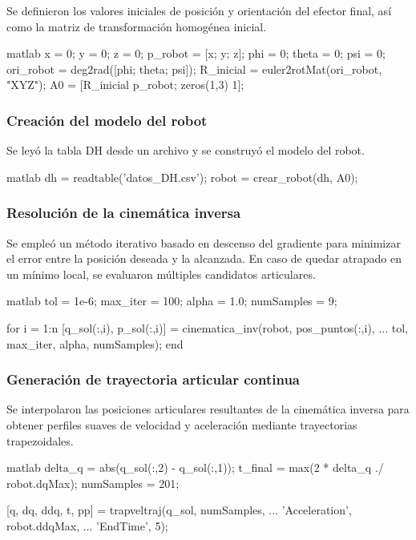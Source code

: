 Se definieron los valores iniciales de posición y orientación del efector final, así como la matriz de transformación homogénea inicial.

\begin{matlabcode}{matlab}
	x = 0; y = 0; z = 0;
	p_robot = [x; y; z];
	phi = 0; theta = 0; psi = 0;
	ori_robot = deg2rad([phi; theta; psi]);
	R_inicial = euler2rotMat(ori_robot, "XYZ");
	A0 = [R_inicial p_robot; zeros(1,3) 1];
\end{matlabcode}

\subsubsection*{Creación del modelo del robot}

Se leyó la tabla DH desde un archivo y se construyó el modelo del robot.

\begin{matlabcode}{matlab}
	dh = readtable('datos\tabla_DH\robotnuestro.csv');
	robot = crear_robot(dh, A0);
\end{matlabcode}


\subsubsection*{Resolución de la cinemática inversa}

Se empleó un método iterativo basado en descenso del gradiente para minimizar el error entre la posición deseada y la alcanzada. En caso de quedar atrapado en un mínimo local, se evaluaron múltiples candidatos articulares.

\begin{matlabcode}{matlab}
	tol = 1e-6;
	max_iter = 100;
	alpha = 1.0;
	numSamples = 9;
	
	for i = 1:n
	[q_sol(:,i), p_sol(:,i)] = cinematica_inv(robot, pos_puntos(:,i), ...
	tol, max_iter, alpha, numSamples);
	end
\end{matlabcode}

\subsubsection*{Generación de trayectoria articular continua}

Se interpolaron las posiciones articulares resultantes de la cinemática inversa para obtener perfiles suaves de velocidad y aceleración mediante trayectorias trapezoidales.

\begin{matlabcode}{matlab}
	delta_q = abs(q_sol(:,2) - q_sol(:,1));
	t_final = max(2 * delta_q ./ robot.dqMax);
	numSamples = 201;
	
	[q, dq, ddq, t, pp] = trapveltraj(q_sol, numSamples, ...
	'Acceleration', robot.ddqMax, ...
	'EndTime', 5);
\end{matlabcode}

